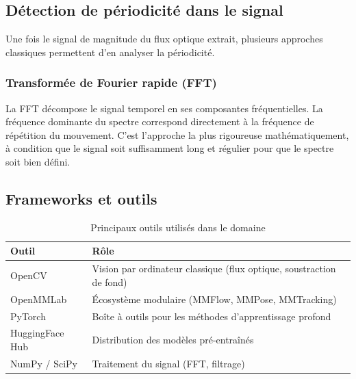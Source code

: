\subsection{Détection de périodicité dans le signal}

Une fois le signal de magnitude du flux optique extrait, plusieurs approches classiques permettent d'en analyser la périodicité.

\subsubsection{Transformée de Fourier rapide (FFT)}

La FFT décompose le signal temporel en ses composantes fréquentielles. La fréquence dominante du spectre correspond directement à la fréquence de répétition du mouvement. C'est l'approche la plus rigoureuse mathématiquement, à condition que le signal soit suffisamment long et régulier pour que le spectre soit bien défini.

\subsection{Frameworks et outils}

\begin{table}[h]
\centering
\caption{Principaux outils utilisés dans le domaine}
\label{tab:frameworks}
\begin{tabular}{ll}
\toprule
\textbf{Outil} & \textbf{Rôle} \\
\midrule
OpenCV              & Vision par ordinateur classique (flux optique, soustraction de fond) \\
OpenMMLab           & Écosystème modulaire (MMFlow, MMPose, MMTracking) \\
PyTorch             & Boîte à outils pour les méthodes d'apprentissage profond \\
HuggingFace Hub     & Distribution des modèles pré-entraînés \\
NumPy / SciPy       & Traitement du signal (FFT, filtrage) \\
\bottomrule
\end{tabular}
\end{table}

